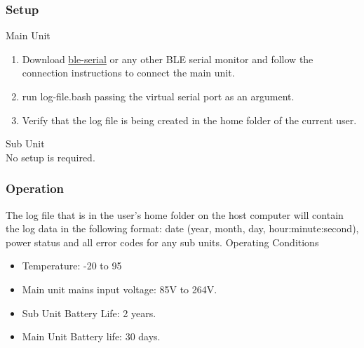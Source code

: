 \subsubsection{Setup}
\large{Main Unit}
\normalsize
\begin{enumerate}
  \item Download \href{https://pypi.org/project/ble-serial/}{ble-serial} or any other BLE serial monitor and follow the connection instructions to connect the main unit.
  \item run log-file.bash passing the virtual serial port as an argument.
  \item Verify that the log file is being created in the home folder of the current user.
\end{enumerate}
\large{Sub Unit\\}
\normalsize
No setup is required.
\subsubsection{Operation}
The log file that is in the user's home folder on the host computer will contain the log data in the following format: date (year, month, day, hour:minute:second), power status and all error codes for any sub units.
\large{Operating Conditions}
\normalsize
\begin{itemize}
  \item Temperature: -20\si{\C} to 95\si{\C}
  \item Main unit mains input voltage: 85\si{\V} to 264\si{\V}.
  \item Sub Unit Battery Life: 2 years.
  \item Main Unit Battery life: 30 days.
\end{itemize}
